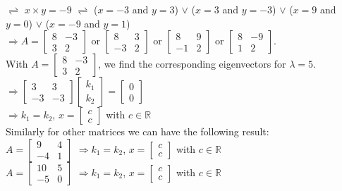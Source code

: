 \documentclass{article}
\begin{document}
\(\rightleftharpoons\) \(x \times y = -9\) \(\rightleftharpoons\)  (\(x = -3\) and \(y = 3\)) \(\vee\) (\(x = 3\) and \(y = -3\)) \(\vee\) (\(x = 9\) and \(y = 0\)) \(\vee\) (\(x = -9\) and \(y = 1\))
\\
\(\Rightarrow A=\begin{bmatrix}8 & -3 \\ 3 & 2 \end{bmatrix}\) or \(\begin{bmatrix}8 & 3 \\ -3 & 2 \end{bmatrix}\) or \(\begin{bmatrix}8 & 9 \\ -1 & 2 \end{bmatrix}\) or \(\begin{bmatrix}8 & -9 \\ 1 & 2 \end{bmatrix}\). 
\\
With \(A=\begin{bmatrix}8 & -3 \\ 3 & 2 \end{bmatrix}\), we find the corresponding eigenvectors for \(\lambda = 5\). 
\\
\(\Rightarrow \begin{bmatrix}3 & 3 \\ -3 & -3 \end{bmatrix} \begin{bmatrix}k_1 \\ k_2 \end{bmatrix} = \begin{bmatrix}0 \\ 0 \end{bmatrix} \)
\\
\(\Rightarrow  k_1 = k_2\), \(x = \begin{bmatrix} c \\ c \end{bmatrix}\) with \(c \in \mathbb{R}\)
\\
Similarly for other matrices we can have the following result: \\
\(A=\begin{bmatrix}9 & 4 \\ -4 & 1 \end{bmatrix}\) 
\(\Rightarrow  k_1 = k_2\), \(x = \begin{bmatrix} c \\ c \end{bmatrix}\) with \(c \in \mathbb{R}\) \\
\(A=\begin{bmatrix}10 & 5 \\ -5 & 0 \end{bmatrix}\)
\(\Rightarrow  k_1 = k_2\), \(x = \begin{bmatrix} c \\ c \end{bmatrix}\) with \(c \in \mathbb{R}\)
\end{document}
